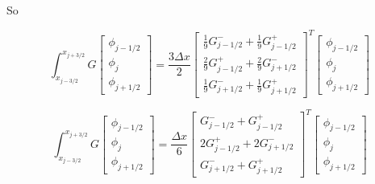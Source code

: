 \documentclass[12pt]{article}
\begin{document}
So

\[\int_{x_{j-3/2}}^{x_{j+3/2}}G\left[\begin{array}{c}\phi_{j-1/2} \\\phi_{j}\\\phi_{j+1/2} \end{array}\right]  = \frac{3 \Delta x}{2}\left[\begin{array}{c}\frac{1}{9}G^-_{j - 1/2}  + \frac{1}{9}G^+_{j - 1/2}  \\ \frac{2}{9} G^+_{j - 1/2} + \frac{2}{9} G^-_{j + 1/2}\\ \frac{1}{9}G^-_{j + 1/2} + \frac{1}{9}G^+_{j + 1/2} \end{array}\right]^T\left[\begin{array}{c}\phi_{j-1/2} \\\phi_{j}\\\phi_{j+1/2} \end{array}\right] \]

\[\int_{x_{j-3/2}}^{x_{j+3/2}}G\left[\begin{array}{c}\phi_{j-1/2} \\\phi_{j}\\\phi_{j+1/2} \end{array}\right]  = \frac{\Delta x}{6}\left[\begin{array}{c}G^-_{j - 1/2}  + G^+_{j - 1/2}  \\ 2 G^+_{j - 1/2} + 2 G^-_{j + 1/2}\\ G^-_{j + 1/2} + G^+_{j + 1/2} \end{array}\right]^T\left[\begin{array}{c}\phi_{j-1/2} \\\phi_{j}\\\phi_{j+1/2} \end{array}\right]\]

\end{document}
